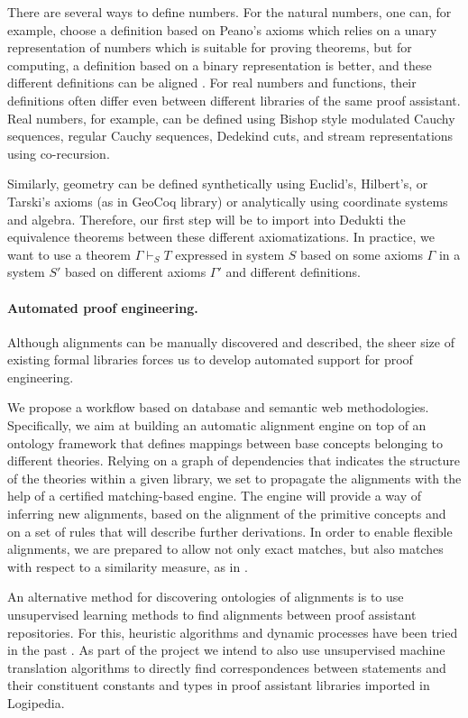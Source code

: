 There are several ways to define numbers. For the natural numbers, one
can, for example, choose a definition based on Peano's axioms which
relies on a unary representation of numbers which is suitable for
proving theorems, but for computing, a definition based on a binary
representation is better, and these different definitions can be
aligned \cite{magaud03DataRepresentation}. For real numbers and
functions, their definitions often differ even between different
libraries of the same proof assistant.  Real numbers, for example, can
be defined using Bishop style modulated Cauchy sequences, regular
Cauchy sequences, Dedekind cuts, and stream representations using
co-recursion.

Similarly, geometry can be defined synthetically using Euclid's,
Hilbert's, or Tarski's axioms (as in GeoCoq library) or analytically
using coordinate systems and algebra. Therefore, our first step will
be to import into Dedukti the equivalence theorems between these
different axiomatizations. In practice, we want to use a theorem
$\Gamma \vdash_S T$ expressed in system $S$ based on some axioms
$\Gamma$ in a system $S'$ based on different axioms $\Gamma'$ and
different definitions.

\paragraph*{Automated proof engineering.}
Although alignments can be manually discovered and described, the
sheer size of existing formal libraries forces us to develop automated
support for proof engineering.

We propose a workflow based on database and semantic web
methodologies. Specifically, we aim at building an automatic alignment
engine on top of an ontology framework that defines mappings between
base concepts belonging to different theories. Relying on a graph of
dependencies that indicates the structure of the theories within a
given library, we set to propagate the alignments with the help of a
certified matching-based engine. The engine will provide a way of
inferring new alignments, based on the alignment of the primitive
concepts and on a set of rules that will describe further
derivations. In order to enable flexible alignments, we are prepared
to allow not only exact matches, but also matches with respect to a
similarity measure, as in \cite{GAUTHIER201989}.

An alternative method for discovering ontologies of alignments is to
use unsupervised learning methods to find alignments between proof
assistant repositories. For this, heuristic algorithms and dynamic
processes have been tried in the past \cite{GAUTHIER201989}.  As part
of the project we intend to also use unsupervised machine translation
algorithms \cite{DBLP:journals/corr/abs-1804-07755} to directly find
correspondences between statements and their constituent constants and
types in proof assistant libraries imported in Logipedia.

